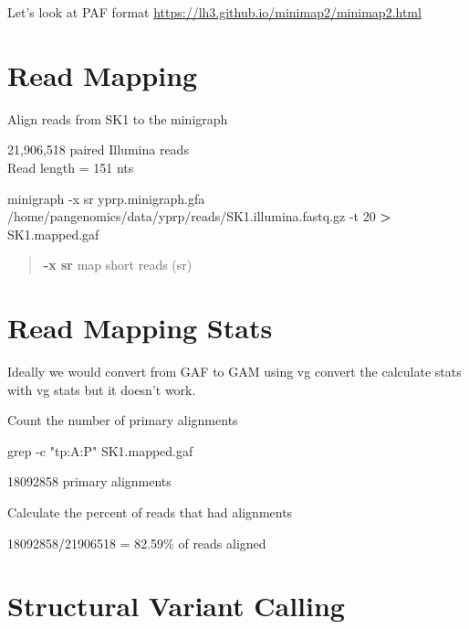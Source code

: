 \documentclass[
]{book}
\newenvironment{Shaded}{\begin{snugshade}}{\end{snugshade}}
\newcommand{\AttributeTok}[1]{\textcolor[rgb]{0.77,0.63,0.00}{#1}}
\newcommand{\ExtensionTok}[1]{#1}
\newcommand{\FunctionTok}[1]{\textcolor[rgb]{0.00,0.00,0.00}{#1}}
\newcommand{\NormalTok}[1]{#1}
\newcommand{\OperatorTok}[1]{\textcolor[rgb]{0.81,0.36,0.00}{\textbf{#1}}}
\newcommand{\StringTok}[1]{\textcolor[rgb]{0.31,0.60,0.02}{#1}}
\begin{document}
Let's look at PAF format
\url{https://lh3.github.io/minimap2/minimap2.html}

\hypertarget{read-mapping}{%
\section{Read Mapping}\label{read-mapping}}

Align reads from SK1 to the minigraph

21,906,518 paired Illumina reads\\
Read length = 151 nts

\begin{Shaded}
\begin{Highlighting}[]
\ExtensionTok{minigraph} \AttributeTok{{-}x}\NormalTok{ sr yprp.minigraph.gfa /home/pangenomics/data/yprp/reads/SK1.illumina.fastq.gz }\AttributeTok{{-}t}\NormalTok{ 20 }\OperatorTok{\textgreater{}}\NormalTok{ SK1.mapped.gaf}
\end{Highlighting}
\end{Shaded}

\begin{quote}
\textbf{-x sr} map short reads (sr)
\end{quote}

\hypertarget{read-mapping-stats}{%
\section{Read Mapping Stats}\label{read-mapping-stats}}

Ideally we would convert from GAF to GAM using vg convert the calculate stats with vg stats but it doesn't work.

Count the number of primary alignments

\begin{Shaded}
\begin{Highlighting}[]
\FunctionTok{grep} \AttributeTok{{-}c} \StringTok{"tp:A:P"}\NormalTok{ SK1.mapped.gaf}
\end{Highlighting}
\end{Shaded}

18092858 primary alignments

Calculate the percent of reads that had alignments

18092858/21906518 = 82.59\% of reads aligned

\hypertarget{structural-variant-calling}{%
\section{Structural Variant Calling}\label{structural-variant-calling}}
\end{document}
